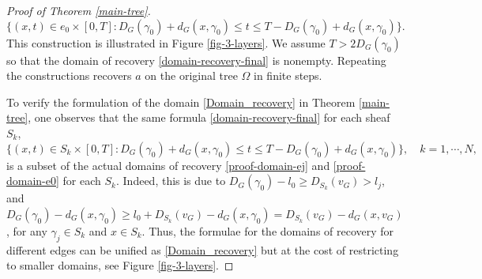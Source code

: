 \documentclass[11pt]{amsart}
\theoremstyle{definition}
\theoremstyle{plain}
\numberwithin{equation}{section}
\begin{document}
\begin{proof}[Proof of Theorem \ref{main-tree}]
\begin{equation} \label{domain-recovery-final}
\big\{ (x,t)\in e_0\times [0,T]:  D_G(\gamma_0)+d_G(x,\gamma_0) \leq t \leq T-D_G(\gamma_0)+d_G(x,\gamma_0)\big\}.
\end{equation}
This construction is illustrated in Figure \ref{fig-3-layers}.
We assume $T>2D_G(\gamma_0)$ so that the domain of recovery \eqref{domain-recovery-final} is nonempty.
Repeating the constructions recovers $a$ on the original tree $\Omega$ in finite steps.


To verify the formulation of the domain \eqref{Domain_recovery} in Theorem \ref{main-tree}, one observes that the same formula \eqref{domain-recovery-final} for each sheaf $S_k$,
$$\big\{ (x,t)\in S_k\times [0,T]:  D_G(\gamma_0)+d_G(x,\gamma_0) \leq t \leq T-D_G(\gamma_0)+d_G(x,\gamma_0)\big\}, \quad k=1,\cdots,N,$$
is a subset of the actual domains of recovery \eqref{proof-domain-ej} and \eqref{proof-domain-e0} for each $S_k$.
Indeed, this is due to $D_G(\gamma_0)-l_0 \geq D_{S_k}(v_G) > l_j$, and $D_G(\gamma_0)-d_G(x,\gamma_0)\geq l_0+D_{S_k}(v_G)-d_G(x,\gamma_0)=D_{S_k}(v_G)-d_G(x,v_G)$, for any $\gamma_j\in S_k$ and $x\in S_k$.
Thus, the formulae for the domains of recovery for different edges can be unified as \eqref{Domain_recovery} but at the cost of restricting to smaller domains, see Figure \ref{fig-3-layers}.
\end{proof}
\end{document}
